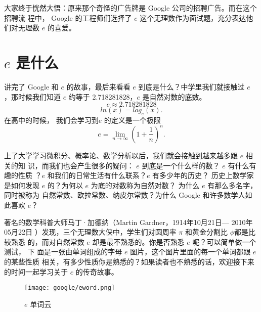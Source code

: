 大家终于恍然大悟：原来那个奇怪的广告牌是 Google 公司的招聘广告。而在这个招聘流
程中， Google 的工程师们选择了 $e$ 这个无理数作为面试题，充分表达他们对无理数
$e$ 的喜爱。
	
\section{$e$ 是什么}
讲完了 Google 和 $e$ 的故事，最后来看看 $e$ 到底是什么？中学里我们就接触过 $e$
，那时候我们知道 $e$ 约等于 2.718281828，$e$ 是自然对数的底数。
$$ e \approx 2.718281828 $$
$$ ln(x) = log_{e}(x) . $$ 
在高中的时候， 我们会学习到$e$ 的定义是一个极限
$$ e = \lim_{n \to \infty}(1+\frac{1}{n})^n  .$$

上了大学学习微积分、概率论、数学分析以后，我们就会接触到越来越多跟 $e$ 相关的知
识，而我们也会产生很多的疑问： $e$ 到底是一个什么样的数？ $e$ 有什么有趣的性质
？$e$ 和我们的日常生活有什么联系？$e$ 有多少年的历史？ 历史上数学家是如何发现
$e$ 的？为何以 $e$ 为底的对数称为自然对数？ 为什么 $e$ 有那么多名字，同时被称为
自然常数、欧拉常数、纳皮尔常数？为什么 Google 和许多数学人如此喜欢 $e$？

著名的数学科普大师马丁·加德纳（Martin Gardner，1914年10月21日— 2010年05月22日
）发现，三个无理数大侠中，学生们对圆周率 $\pi$ 和黄金分割比 $\phi$都是比较熟悉
的，而对自然常数 $e$ 却是最不熟悉的。你是否熟悉 $e$ 呢？可以简单做一个测试， 下
面是一张由单词组成的字母 $e$ 图片，这个图片里面的每一个单词都跟 $e$ 的某些性质
相关，有多少性质你是熟悉的？如果读者也不熟悉的话，欢迎接下来的时间一起学习关于
$e$ 的传奇故事。
\begin{figure}[htbp]
\centering
\texttt{[image: google/eword.png]}
\caption{$e$ 单词云}
\centering
\end{figure}



